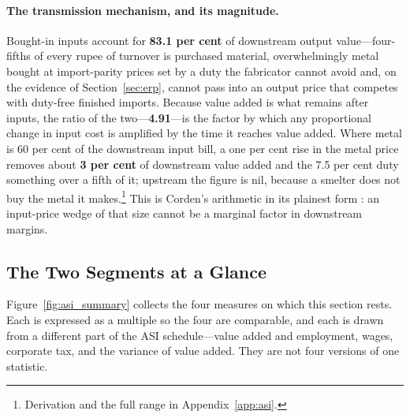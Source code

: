 \documentclass[11pt, a4paper]{article}
\numberwithin{figure}{section}
\numberwithin{table}{section}
\begin{document}
\paragraph{The transmission mechanism, and its magnitude.} Bought-in inputs account for \textbf{83.1 per cent} of downstream output value---four-fifths of every rupee of turnover is purchased material, overwhelmingly metal bought at import-parity prices set by a duty the fabricator cannot avoid and, on the evidence of Section~\ref{sec:erp}, cannot pass into an output price that competes with duty-free finished imports. Because value added is what remains after inputs, the ratio of the two---\textbf{4.91}---is the factor by which any proportional change in input cost is amplified by the time it reaches value added. Where metal is 60 per cent of the downstream input bill, a one per cent rise in the metal price removes about \textbf{3 per cent} of downstream value added and the 7.5 per cent duty something over a fifth of it; upstream the figure is nil, because a smelter does not buy the metal it makes.\footnote{Derivation and the full range in Appendix~\ref{app:asi}.} This is Corden's arithmetic in its plainest form \cite{corden1966}: an input-price wedge of that size cannot be a marginal factor in downstream margins.

\subsection{The Two Segments at a Glance}

Figure~\ref{fig:asi_summary} collects the four measures on which this section rests. Each is expressed as a multiple so the four are comparable, and each is drawn from a different part of the ASI schedule---value added and employment, wages, corporate tax, and the variance of value added. They are not four versions of one statistic.
\end{document}
